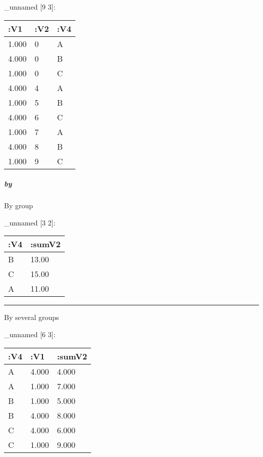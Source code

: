\documentclass[]{article}
\newenvironment{Shaded}{\begin{snugshade}}{\end{snugshade}}
\newcommand{\KeywordTok}[1]{\textcolor[rgb]{0.13,0.29,0.53}{\textbf{#1}}}
\newcommand{\VariableTok}[1]{\textcolor[rgb]{0.00,0.00,0.00}{#1}}
\newcommand{\AttributeTok}[1]{\textcolor[rgb]{0.77,0.63,0.00}{#1}}
\newcommand{\NormalTok}[1]{#1}
\let\oldsubparagraph\subparagraph
\renewcommand{\subparagraph}[1]{\oldsubparagraph{#1}\mbox{}}
\begin{document}
\_unnamed {[}9 3{]}:

\begin{longtable}[]{@{}lll@{}}
\toprule
:V1 & :V2 & :V4\tabularnewline
\midrule
\endhead
1.000 & 0 & A\tabularnewline
4.000 & 0 & B\tabularnewline
1.000 & 0 & C\tabularnewline
4.000 & 4 & A\tabularnewline
1.000 & 5 & B\tabularnewline
4.000 & 6 & C\tabularnewline
1.000 & 7 & A\tabularnewline
4.000 & 8 & B\tabularnewline
1.000 & 9 & C\tabularnewline
\bottomrule
\end{longtable}

\subparagraph{by}\label{by}

By group

\begin{Shaded}
\end{Shaded}

\_unnamed {[}3 2{]}:

\begin{longtable}[]{@{}ll@{}}
\toprule
:V4 & :sumV2\tabularnewline
\midrule
\endhead
B & 13.00\tabularnewline
C & 15.00\tabularnewline
A & 11.00\tabularnewline
\bottomrule
\end{longtable}

\begin{center}\rule{0.5\linewidth}{0.5pt}\end{center}

By several groups

\begin{Shaded}
\end{Shaded}

\_unnamed {[}6 3{]}:

\begin{longtable}[]{@{}lll@{}}
\toprule
:V4 & :V1 & :sumV2\tabularnewline
\midrule
\endhead
A & 4.000 & 4.000\tabularnewline
A & 1.000 & 7.000\tabularnewline
B & 1.000 & 5.000\tabularnewline
B & 4.000 & 8.000\tabularnewline
C & 4.000 & 6.000\tabularnewline
C & 1.000 & 9.000\tabularnewline
\bottomrule
\end{longtable}
\end{document}
